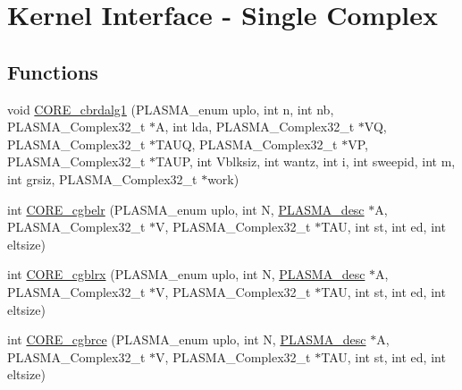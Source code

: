 \hypertarget{group__CORE__PLASMA__Complex32__t}{}\section{Kernel Interface -\/ Single Complex}
\label{group__CORE__PLASMA__Complex32__t}
\subsection*{Functions}
\begin{DoxyCompactItemize}
\item 
void \hyperlink{group__CORE__PLASMA__Complex32__t_gacb63b22910fcb96ad757bad04d80bef4_gacb63b22910fcb96ad757bad04d80bef4}{C\+O\+R\+E\+\_\+cbrdalg1} (P\+L\+A\+S\+M\+A\+\_\+enum uplo, int n, int nb, P\+L\+A\+S\+M\+A\+\_\+\+Complex32\+\_\+t $\ast$A, int lda, P\+L\+A\+S\+M\+A\+\_\+\+Complex32\+\_\+t $\ast$V\+Q, P\+L\+A\+S\+M\+A\+\_\+\+Complex32\+\_\+t $\ast$T\+A\+U\+Q, P\+L\+A\+S\+M\+A\+\_\+\+Complex32\+\_\+t $\ast$V\+P, P\+L\+A\+S\+M\+A\+\_\+\+Complex32\+\_\+t $\ast$T\+A\+U\+P, int Vblksiz, int wantz, int i, int sweepid, int m, int grsiz, P\+L\+A\+S\+M\+A\+\_\+\+Complex32\+\_\+t $\ast$work)
\item 
int \hyperlink{group__CORE__PLASMA__Complex32__t_ga4946ac6b253acee9fc398bab035c7b92_ga4946ac6b253acee9fc398bab035c7b92}{C\+O\+R\+E\+\_\+cgbelr} (P\+L\+A\+S\+M\+A\+\_\+enum uplo, int N, \hyperlink{structplasma__desc__t}{P\+L\+A\+S\+M\+A\+\_\+desc} $\ast$A, P\+L\+A\+S\+M\+A\+\_\+\+Complex32\+\_\+t $\ast$V, P\+L\+A\+S\+M\+A\+\_\+\+Complex32\+\_\+t $\ast$T\+A\+U, int st, int ed, int eltsize)
\item 
int \hyperlink{group__CORE__PLASMA__Complex32__t_ga4415cbf61356f4e5a3291688d94e7913_ga4415cbf61356f4e5a3291688d94e7913}{C\+O\+R\+E\+\_\+cgblrx} (P\+L\+A\+S\+M\+A\+\_\+enum uplo, int N, \hyperlink{structplasma__desc__t}{P\+L\+A\+S\+M\+A\+\_\+desc} $\ast$A, P\+L\+A\+S\+M\+A\+\_\+\+Complex32\+\_\+t $\ast$V, P\+L\+A\+S\+M\+A\+\_\+\+Complex32\+\_\+t $\ast$T\+A\+U, int st, int ed, int eltsize)
\item 
int \hyperlink{group__CORE__PLASMA__Complex32__t_ga8d540e27bad6f137a7fe34d87a443098_ga8d540e27bad6f137a7fe34d87a443098}{C\+O\+R\+E\+\_\+cgbrce} (P\+L\+A\+S\+M\+A\+\_\+enum uplo, int N, \hyperlink{structplasma__desc__t}{P\+L\+A\+S\+M\+A\+\_\+desc} $\ast$A, P\+L\+A\+S\+M\+A\+\_\+\+Complex32\+\_\+t $\ast$V, P\+L\+A\+S\+M\+A\+\_\+\+Complex32\+\_\+t $\ast$T\+A\+U, int st, int ed, int eltsize)
\item 

\end{DoxyCompactItemize}
